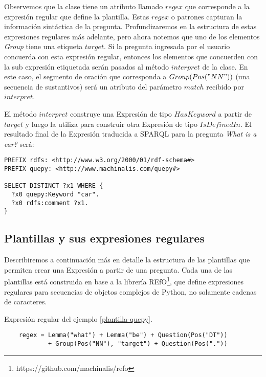 Observemos que la clase tiene un atributo llamado $regex$ que corresponde a la expresión regular que define la plantilla. Estas $regex$ o patrones capturan la información sintáctica de la pregunta. Profundizaremos en la estructura de estas expresiones regulares más adelante, pero ahora notemos que uno de los elementos \textit{Group} tiene una etiqueta $target$. Si la pregunta ingresada por el usuario concuerda con esta expresión regular, entonces los elementos que concuerden con la sub expresión etiquetada serán pasados al método $interpret$ de la clase. En este caso, el segmento de oración que corresponda a $Group(Pos("NN"))$ (una secuencia de sustantivos) será un atributo del parámetro $match$ recibido por $interpret$.

El método $interpret$ construye una Expresión de tipo $HasKeyword$ a partir de $target$ y luego la utiliza para construir otra Expresión de tipo $IsDefinedIn$. El resultado final de la Expresión traducida a SPARQL para la pregunta \textit{What is a car?} será:

\vspace{5mm}

\begin{lstlisting}
PREFIX rdfs: <http://www.w3.org/2000/01/rdf-schema#>
PREFIX quepy: <http://www.machinalis.com/quepy#>

SELECT DISTINCT ?x1 WHERE {
  ?x0 quepy:Keyword "car".
  ?x0 rdfs:comment ?x1.
}
\end{lstlisting}

\vspace{5mm}

\subsection{Plantillas y sus expresiones regulares}

Describiremos a continuación más en detalle la estructura de las plantillas que permiten crear una Expresión a partir de una pregunta. Cada una de las plantillas está construida en base a la librería REfO\footnote{https://github.com/machinalis/refo}, que define expresiones regulares para secuencias de objetos complejos de Python, no solamente cadenas de caracteres.

\begin{example}\label{regex} Expresión regular del ejemplo \ref{plantilla-quepy}.
    \begin{lstlisting}
    regex = Lemma("what") + Lemma("be") + Question(Pos("DT"))
            + Group(Pos("NN"), "target") + Question(Pos("."))
    \end{lstlisting}
\end{example}

